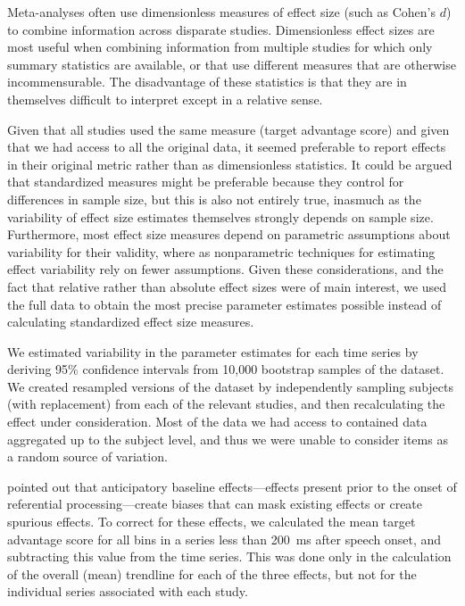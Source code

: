 \documentclass[doc,fignum,apacite,floatsintext]{apa6}
\begin{document}
Meta-analyses often use dimensionless measures of effect size (such as Cohen's \(d\)) to combine information across disparate studies.  Dimensionless effect sizes are most useful when combining information from multiple studies for which only summary statistics are available, or that use different measures that are otherwise incommensurable.  The disadvantage of these statistics is that they are in themselves difficult to interpret except in a relative sense.

Given that all studies used the same measure (target advantage score) and given that we had access to all the original data, it seemed preferable to report effects in their original metric rather than as dimensionless statistics.  It could be argued that standardized measures might be preferable because they control for differences in sample size, but this is also not entirely true, inasmuch as the variability of effect size estimates themselves strongly depends on sample size.  Furthermore, most effect size measures depend on parametric assumptions about variability for their validity, where as nonparametric techniques for estimating effect variability rely on fewer assumptions.  Given these considerations, and the fact that relative rather than absolute effect sizes were of main interest, we used the full data to obtain the most precise parameter estimates possible instead of calculating standardized effect size measures.

We estimated variability in the parameter estimates for each time series by deriving 95\% confidence intervals from 10,000 bootstrap samples of the dataset.  We created resampled versions of the dataset by independently sampling subjects (with replacement) from each of the relevant studies, and then recalculating the effect under consideration.  Most of the data we had access to contained data aggregated up to the subject level, and thus we were unable to consider items as a random source of variation.

 pointed out that anticipatory baseline effects---effects present prior to the onset of referential processing---create biases that can mask existing effects or create spurious effects.  To correct for these effects, we calculated the mean target advantage score for all bins in a series less than 200~ms after speech onset, and subtracting this value from the time series.  This was done only in the calculation of the overall (mean) trendline for each of the three effects, but not for the individual series associated with each study.
\end{document}
